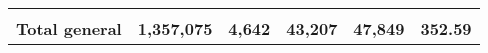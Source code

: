 \begin{tabular}{lrcclr}
	& \multicolumn{1}{l}{}                                           & \multicolumn{1}{l}{}                                       & \multicolumn{1}{l}{} &                                                                     & \multicolumn{1}{l}{}                                                         \\
	\rowcolor[HTML]{DDEBF7} 
	\textbf{Total   general}                                       & \textbf{1,357,075}                                             & \multicolumn{1}{r}{\cellcolor[HTML]{DDEBF7}\textbf{4,642}} & \textbf{43,207}      & \textbf{47,849}                                                     & \textbf{352.59}                                                             
\end{tabular}